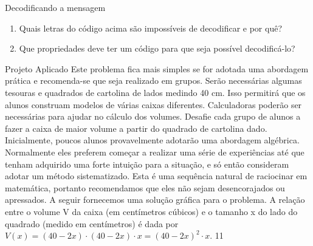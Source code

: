 \begin{task}{ Decodificando a mensagem}
\begin{enumerate}
\item {} 
Quais letras do código acima são impossíveis de decodificar e por quê?

\item {} 
Que propriedades deve ter um código para que seja possível decodificá-lo?

\end{enumerate}

\end{task}

\clearpage
\def\currentcolor{cor2}
\begin{sugestions}{Projeto Aplicado}
{
  Este problema fica mais simples se for adotada uma abordagem prática e recomenda-se que seja realizado em grupos. Serão necessárias algumas tesouras e quadrados de cartolina de lados medindo 40 cm. Isso permitirá que os alunos construam modelos de várias caixas diferentes. Calculadoras poderão ser necessárias para ajudar no cálculo dos volumes. Desafie cada grupo de alunos a fazer a caixa de maior volume a partir do quadrado de cartolina dado. Inicialmente, poucos alunos provavelmente adotarão uma abordagem algébrica. Normalmente eles preferem começar a realizar uma série de experiências até que tenham adquirido uma forte intuição para a situação, e só então consideram adotar um método sistematizado. Esta é uma sequência natural de raciocinar em matemática, portanto recomendamos que eles não sejam desencorajados ou apressados. A seguir fornecemos uma solução gráfica para o problema. A relação entre o volume V da caixa (em centímetros cúbicos) e o tamanho x do lado do quadrado (medido em centímetros) é dada por $V(x)=(40−2x)\cdot(40−2x)\cdot x=(40−2x)^2\cdot x$.
}{1}1
\end{sugestions}

